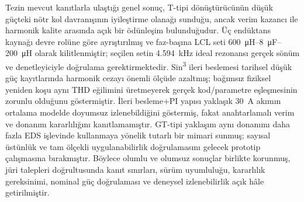 Tezin mevcut kanıtlarla ulaştığı genel sonuç, T-tipi dönüştürücünün düşük güçteki nötr kol davranışının iyileştirme olanağı sunduğu, ancak verim kazancı ile harmonik kalite arasında açık bir ödünleşim bulunduğudur. Üç endüktans kaynağı devre rolüne göre ayrıştırılmış ve faz-başına LCL seti \SI{600}{\micro\henry}--\SI{8}{\micro\farad}--\SI{200}{\micro\henry} olarak kilitlenmiştir; seçilen setin \SI{4.594}{\kilo\hertz} ideal rezonansı gerçek sönüm ve denetleyiciyle doğrulama gerektirmektedir. Sin\textsuperscript{3} ileri beslemesi tarihsel düşük güç kayıtlarında harmonik cezayı önemli ölçüde azaltmış; bağımsız fiziksel yeniden koşu aynı THD eğilimini üretmeyerek gerçek kod/parametre eşleşmesinin zorunlu olduğunu göstermiştir. İleri besleme+PI yapısı yaklaşık 30~A akımın ortalama modelde doyumsuz izlenebildiğini göstermiş, fakat anahtarlamalı verim ve donanım kararlılığını kanıtlamamıştır. GT-tipi yaklaşım aynı donanımı daha fazla EDS işlevinde kullanmaya yönelik tutarlı bir mimari sunmuş; sayısal üstünlük ve tam ölçekli uygulanabilirlik doğrulamasını gelecek prototip çalışmasına bırakmıştır. Böylece olumlu ve olumsuz sonuçlar birlikte korunmuş, jüri talepleri doğrultusunda kanıt sınırları, sürüm uyumluluğu, kararlılık gereksinimi, nominal güç doğrulaması ve deneysel izlenebilirlik açık hâle getirilmiştir.
